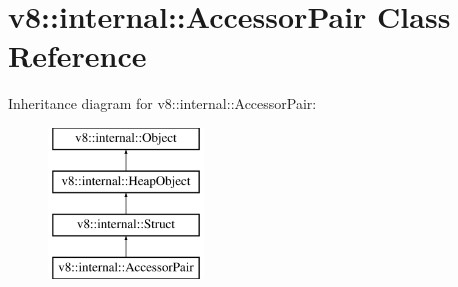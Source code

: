 \hypertarget{classv8_1_1internal_1_1AccessorPair}{}\section{v8\+:\+:internal\+:\+:Accessor\+Pair Class Reference}
\label{classv8_1_1internal_1_1AccessorPair}
Inheritance diagram for v8\+:\+:internal\+:\+:Accessor\+Pair\+:\begin{figure}[H]
\begin{center}
\leavevmode
\includegraphics[height=4.000000cm]{classv8_1_1internal_1_1AccessorPair}
\end{center}
\end{figure}
